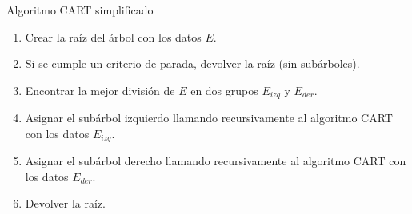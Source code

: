 \begin{algorithm}[h]
\label{cart}
\caption{Algoritmo CART simplificado}
\SetAlgoLined
\medskip
\begin{enumerate}
    \item Crear la raíz del árbol con los datos $E$.
    \item Si se cumple un criterio de parada, devolver la raíz (sin subárboles).
    \item Encontrar la mejor división de $E$ en dos grupos $E_{izq}$ y $E_{der}$.
    \item Asignar el subárbol izquierdo llamando recursivamente al algoritmo CART con los datos $E_{izq}$.
    \item Asignar el subárbol derecho llamando recursivamente al algoritmo CART con los datos $E_{der}$.
    \item Devolver la raíz.
\end{enumerate}
\end{algorithm}
